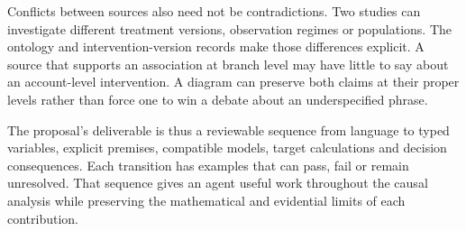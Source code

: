 Conflicts between sources also need not be contradictions. Two studies
can investigate different treatment versions, observation regimes or
populations. The ontology and intervention-version records make those
differences explicit. A source that supports an association at branch
level may have little to say about an account-level intervention. A
diagram can preserve both claims at their proper levels rather than
force one to win a debate about an underspecified phrase.

The proposal's deliverable is thus a reviewable sequence from language
to typed variables, explicit premises, compatible models, target
calculations and decision consequences. Each transition has examples
that can pass, fail or remain unresolved. That sequence gives an agent
useful work throughout the causal analysis while preserving the
mathematical and evidential limits of each contribution.
\label{exec13:ontology-development-end}
